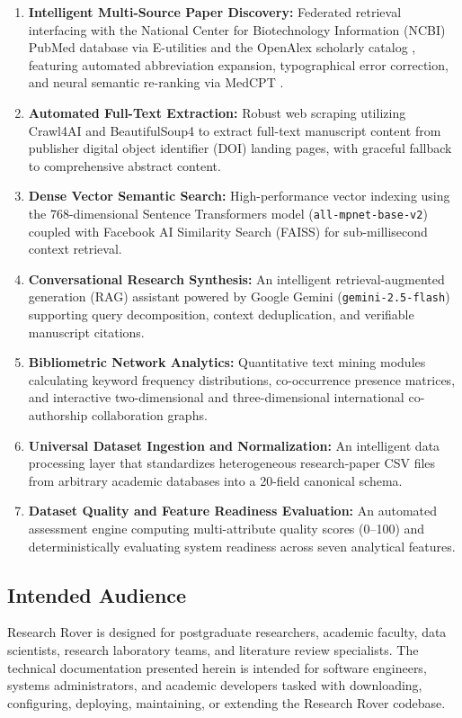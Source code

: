 \begin{enumerate}
    \item \textbf{Intelligent Multi-Source Paper Discovery:} Federated retrieval interfacing with the National Center for Biotechnology Information (NCBI) PubMed database via E-utilities \cite{sayers2022eutilities} and the OpenAlex scholarly catalog \cite{priem2022openalex}, featuring automated abbreviation expansion, typographical error correction, and neural semantic re-ranking via MedCPT \cite{jin2023medcpt}.
    \item \textbf{Automated Full-Text Extraction:} Robust web scraping utilizing Crawl4AI and BeautifulSoup4 to extract full-text manuscript content from publisher digital object identifier (DOI) landing pages, with graceful fallback to comprehensive abstract content.
    \item \textbf{Dense Vector Semantic Search:} High-performance vector indexing using the 768-dimensional Sentence Transformers model (\texttt{all-mpnet-base-v2}) \cite{reimers2019sentence} coupled with Facebook AI Similarity Search (FAISS) \cite{johnson2019billion} for sub-millisecond context retrieval.
    \item \textbf{Conversational Research Synthesis:} An intelligent retrieval-augmented generation (RAG) assistant powered by Google Gemini (\texttt{gemini-2.5-flash}) supporting query decomposition, context deduplication, and verifiable manuscript citations.
    \item \textbf{Bibliometric Network Analytics:} Quantitative text mining modules calculating keyword frequency distributions, co-occurrence presence matrices, and interactive two-dimensional and three-dimensional international co-authorship collaboration graphs.
    \item \textbf{Universal Dataset Ingestion and Normalization:} An intelligent data processing layer that standardizes heterogeneous research-paper CSV files from arbitrary academic databases into a 20-field canonical schema.
    \item \textbf{Dataset Quality and Feature Readiness Evaluation:} An automated assessment engine computing multi-attribute quality scores (0--100) and deterministically evaluating system readiness across seven analytical features.
\end{enumerate}

\subsection{Intended Audience}
Research Rover is designed for postgraduate researchers, academic faculty, data scientists, research laboratory teams, and literature review specialists. The technical documentation presented herein is intended for software engineers, systems administrators, and academic developers tasked with downloading, configuring, deploying, maintaining, or extending the Research Rover codebase.

